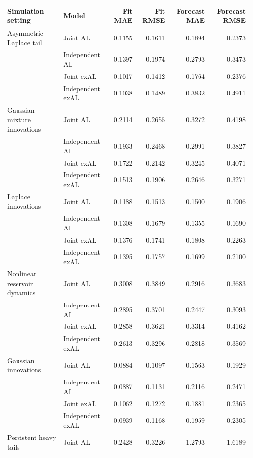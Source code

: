 \begin{table}[p]
\centering
\footnotesize
\setlength{\tabcolsep}{3pt}
\renewcommand{\arraystretch}{1.08}
\begin{tabular}{@{}>{\raggedright\arraybackslash}p{}>{\raggedright\arraybackslash}p{}rrrr@{}}
\toprule
Simulation setting & Model & Fit MAE & Fit RMSE & Forecast MAE & Forecast RMSE \\
\midrule
Asymmetric-Laplace tail & Joint AL & 0.1155 & 0.1611 & 0.1894 & 0.2373 \\
 & Independent AL & 0.1397 & 0.1974 & 0.2793 & 0.3473 \\
 & Joint exAL & 0.1017 & 0.1412 & 0.1764 & 0.2376 \\
 & Independent exAL & 0.1038 & 0.1489 & 0.3832 & 0.4911 \\
\addlinespace[2pt]
Gaussian-mixture innovations & Joint AL & 0.2114 & 0.2655 & 0.3272 & 0.4198 \\
 & Independent AL & 0.1933 & 0.2468 & 0.2991 & 0.3827 \\
 & Joint exAL & 0.1722 & 0.2142 & 0.3245 & 0.4071 \\
 & Independent exAL & 0.1513 & 0.1906 & 0.2646 & 0.3271 \\
\addlinespace[2pt]
Laplace innovations & Joint AL & 0.1188 & 0.1513 & 0.1500 & 0.1906 \\
 & Independent AL & 0.1308 & 0.1679 & 0.1355 & 0.1690 \\
 & Joint exAL & 0.1376 & 0.1741 & 0.1808 & 0.2263 \\
 & Independent exAL & 0.1395 & 0.1757 & 0.1699 & 0.2100 \\
\addlinespace[2pt]
Nonlinear reservoir dynamics & Joint AL & 0.3008 & 0.3849 & 0.2916 & 0.3683 \\
 & Independent AL & 0.2895 & 0.3701 & 0.2447 & 0.3093 \\
 & Joint exAL & 0.2858 & 0.3621 & 0.3314 & 0.4162 \\
 & Independent exAL & 0.2613 & 0.3296 & 0.2818 & 0.3569 \\
\addlinespace[2pt]
Gaussian innovations & Joint AL & 0.0884 & 0.1097 & 0.1563 & 0.1929 \\
 & Independent AL & 0.0887 & 0.1131 & 0.2116 & 0.2471 \\
 & Joint exAL & 0.1062 & 0.1272 & 0.1881 & 0.2365 \\
 & Independent exAL & 0.0939 & 0.1168 & 0.1959 & 0.2305 \\
\addlinespace[2pt]
Persistent heavy tails & Joint AL & 0.2428 & 0.3226 & 1.2793 & 1.6189 \\

\end{tabular}
\end{table}
